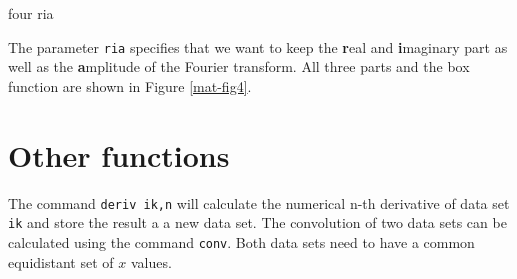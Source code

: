 \begin{MacVerbatim}
  four ria
\end{MacVerbatim}

The parameter {\tt ria} specifies that we want to keep the {\bf
r}eal and {\bf i}maginary part as well as the {\bf a}mplitude of the
Fourier transform. All three parts and the box function are shown in
Figure \ref{mat-fig4}.



\section{Other functions \label{mat-other}}

The command {\tt deriv ik,n} will calculate the numerical n-th
derivative of data set {\tt ik} and store the result a a new data
set. The convolution of two data sets can be calculated using the
command {\tt conv}. Both data sets need to have a common equidistant
set of $x$ values. 
